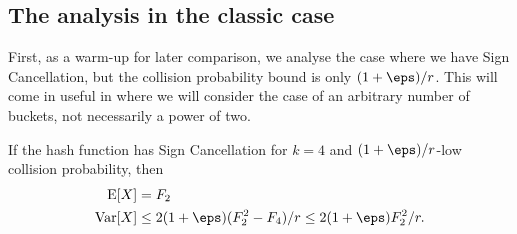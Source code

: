 \subsection{The analysis in the classic case}
First, as a warm-up for later comparison, we analyse the
case where we have Sign Cancellation, but
the collision probability bound is only $(1+\eps)/r$.
This will come in useful in  where we will consider the case of an arbitrary number of buckets, not necessarily a power of two.
\begin{lemma}\label{lem:count-classic}
   If the hash function has Sign Cancellation for $k = 4$ and $(1+\eps)/r$-low collision probability, then
    \begin{align}
        \E[X] &= F_2 \\
        \Var[X] &\le 2(1 + \eps)(F_2^2 - F_4)/r \le 2(1 + \eps)F_2^2/r .
    \end{align}
\end{lemma}
